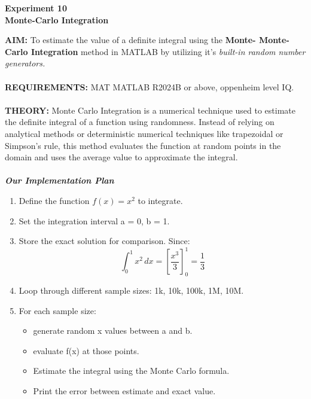 \documentclass[12pt]{report}
\begin{document}
  \newpage 
  \begin{center}
    \textbf{\LARGE Experiment 10} \\
    \vspace{0.2cm}
    \textbf{\large Monte-Carlo Integration}
  \end{center}
  \noindent \textbf{AIM:} To estimate the value of a definite integral using the \textbf{Monte- Monte-Carlo Integration} method in MATLAB by utilizing it's \textit{built-in random number generators.} \\ \\
  \textbf{REQUIREMENTS:} MAT MATLAB R2024B or above, oppenheim level IQ. \\ \\
  \textbf{THEORY:} Monte Carlo Integration is a numerical technique used to estimate the definite integral of a function using randomness. Instead of relying on analytical methods or deterministic numerical techniques like trapezoidal or Simpson’s rule, this method evaluates the function at random points in the domain and uses the average value to approximate the integral. \cite{chatgpt}\\ \\ 
  \textbf{\textit{Our Implementation Plan}}
  \begin{enumerate}
    \item Define the function $f(x) = x^2$ to integrate.
    \item Set the integration interval a = 0, b = 1.
    \item Store the exact solution for comparison. Since: \[ \int_{0}^{1} x^2 \, dx = \left[ \frac{x^3}{3} \right]_{0}^{1} = \frac{1}{3} \]
    \item Loop through different sample sizes: 1k, 10k, 100k, 1M, 10M.
    \item For each sample size:
      \begin{itemize}
        \item generate random x values between a and b.
        \item evaluate f(x) at those points. 
        \item Estimate the integral using the Monte Carlo formula.
        \item Print the error between estimate and exact value.
      \end{itemize}
  \end{enumerate}
\end{document}
